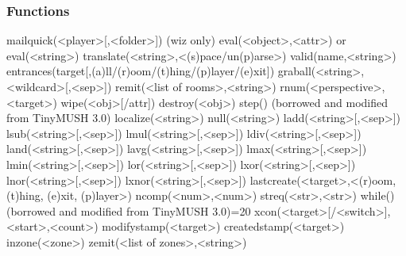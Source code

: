 \documentclass[letterpaper,10pt,english]{sphinxmanual}
\begin{document}
\subsubsection{Functions}
\label{\detokenize{changelog:id85}}
\sphinxAtStartPar
mailquick(\textless{}player\textgreater{}{[},\textless{}folder\textgreater{}{]}) (wiz only)
eval(\textless{}object\textgreater{},\textless{}attr\textgreater{}) or eval(\textless{}string\textgreater{})
translate(\textless{}string\textgreater{},\textless{}(s)pace/un(p)arse\textgreater{})
valid(name,\textless{}string\textgreater{})
entrances(target{[},(a)ll/(r)oom/(t)hing/(p)layer/(e)xit{]})
graball(\textless{}string\textgreater{},\textless{}wildcard\textgreater{}{[},\textless{}sep\textgreater{}{]})
remit(\textless{}list of rooms\textgreater{},\textless{}string\textgreater{})
rnum(\textless{}perspective\textgreater{},\textless{}target\textgreater{})
wipe(\textless{}obj\textgreater{}{[}/attr{]})
destroy(\textless{}obj\textgreater{})
step() (borrowed and modified from TinyMUSH 3.0)
localize(\textless{}string\textgreater{})
null(\textless{}string\textgreater{})
ladd(\textless{}string\textgreater{}{[},\textless{}sep\textgreater{}{]})
lsub(\textless{}string\textgreater{}{[},\textless{}sep\textgreater{}{]})
lmul(\textless{}string\textgreater{}{[},\textless{}sep\textgreater{}{]})
ldiv(\textless{}string\textgreater{}{[},\textless{}sep\textgreater{}{]})
land(\textless{}string\textgreater{}{[},\textless{}sep\textgreater{}{]})
lavg(\textless{}string\textgreater{}{[},\textless{}sep\textgreater{}{]})
lmax(\textless{}string\textgreater{}{[},\textless{}sep\textgreater{}{]})
lmin(\textless{}string\textgreater{}{[},\textless{}sep\textgreater{}{]})
lor(\textless{}string\textgreater{}{[},\textless{}sep\textgreater{}{]})
lxor(\textless{}string\textgreater{}{[},\textless{}sep\textgreater{}{]})
lnor(\textless{}string\textgreater{}{[},\textless{}sep\textgreater{}{]})
lxnor(\textless{}string\textgreater{}{[},\textless{}sep\textgreater{}{]})
lastcreate(\textless{}target\textgreater{},\textless{}(r)oom, (t)hing, (e)xit, (p)layer\textgreater{})
ncomp(\textless{}num\textgreater{},\textless{}num\textgreater{})
streq(\textless{}str\textgreater{},\textless{}str\textgreater{})
while() (borrowed and modified from TinyMUSH 3.0)=20
xcon(\textless{}target\textgreater{}{[}/\textless{}switch\textgreater{}{]},\textless{}start\textgreater{},\textless{}count\textgreater{})
modifystamp(\textless{}target\textgreater{})
createdstamp(\textless{}target\textgreater{})
inzone(\textless{}zone\textgreater{})
zemit(\textless{}list of zones\textgreater{},\textless{}string\textgreater{})
\end{document}
